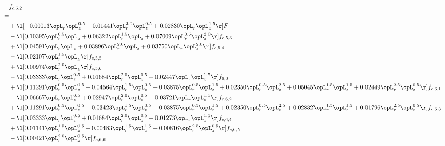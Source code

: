 \begin{alignat}{2} 
\label{eq:f_52_2} 
& f_{c,5,2} \nonumber \\ 
 = \\ 
& + \l[  -0.00013 \opL_r \opL_z^{0.5}   -0.01441 \opL_r^{2.0} \opL_z^{0.5} +  0.02830 \opL_r \opL_z^{1.5}  \r] F \nonumber \\ 
& - \l[  0.10395 \opL_r^{0.5} \opL_z +  0.06322 \opL_r^{1.5} \opL_z +  0.07009 \opL_r^{0.5} \opL_z^{2.0}  \r] f_{c,5,3} \nonumber \\ 
& + \l[  0.04591 \opL_r \opL_z +  0.03896 \opL_r^{2.0} \opL_z +  0.03750 \opL_r \opL_z^{2.0}  \r] f_{c,5,4} \nonumber \\ 
& - \l[  0.02107 \opL_r^{1.5} \opL_z  \r] f_{c,5,5} \nonumber \\ 
& + \l[  0.00974 \opL_r^{2.0} \opL_z  \r] f_{c,5,6} \nonumber \\ 
& - \l[  0.03333 \opL_r \opL_z^{0.5} +  0.01684 \opL_r^{2.0} \opL_z^{0.5} +  0.02447 \opL_r \opL_z^{1.5}  \r] f_{6,0} \nonumber \\ 
& + \l[  0.11291 \opL_r^{0.5} \opL_z^{0.5} +  0.04564 \opL_r^{1.5} \opL_z^{0.5} +  0.03875 \opL_r^{0.5} \opL_z^{1.5} +  0.02350 \opL_r^{0.5} \opL_z^{2.5} +  0.05045 \opL_r^{1.5} \opL_z^{1.5} +  0.02449 \opL_r^{2.5} \opL_z^{0.5}  \r] f_{c,6,1} \nonumber \\ 
& - \l[  0.06667 \opL_r \opL_z^{0.5} +  0.02947 \opL_r^{2.0} \opL_z^{0.5} +  0.03721 \opL_r \opL_z^{1.5}  \r] f_{c,6,2} \nonumber \\ 
& + \l[  0.11291 \opL_r^{0.5} \opL_z^{0.5} +  0.03423 \opL_r^{1.5} \opL_z^{0.5} +  0.03875 \opL_r^{0.5} \opL_z^{1.5} +  0.02350 \opL_r^{0.5} \opL_z^{2.5} +  0.02832 \opL_r^{1.5} \opL_z^{1.5} +  0.01796 \opL_r^{2.5} \opL_z^{0.5}  \r] f_{c,6,3} \nonumber \\ 
& - \l[  0.03333 \opL_r \opL_z^{0.5} +  0.01684 \opL_r^{2.0} \opL_z^{0.5} +  0.01273 \opL_r \opL_z^{1.5}  \r] f_{c,6,4} \nonumber \\ 
& + \l[  0.01141 \opL_r^{1.5} \opL_z^{0.5} +  0.00483 \opL_r^{1.5} \opL_z^{1.5} +  0.00816 \opL_r^{2.5} \opL_z^{0.5}  \r] f_{c,6,5} \nonumber \\ 
& - \l[  0.00421 \opL_r^{2.0} \opL_z^{0.5}  \r] f_{c,6,6} \nonumber \\ 
\end{alignat} 


